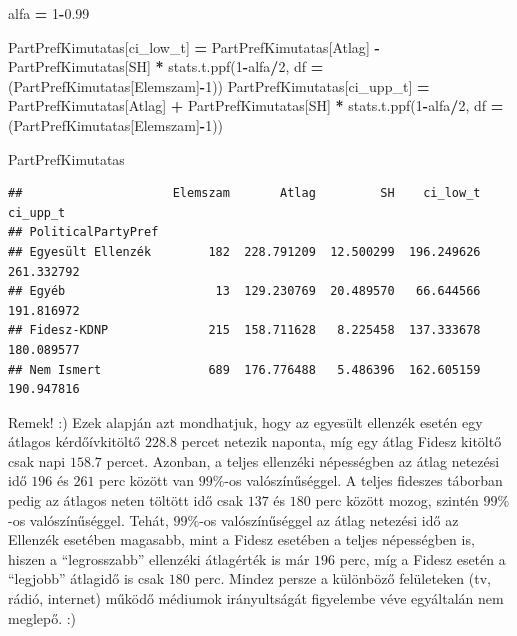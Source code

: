 \documentclass[
]{book}
\newenvironment{Shaded}{\begin{snugshade}}{\end{snugshade}}
\newcommand{\DecValTok}[1]{\textcolor[rgb]{0.00,0.00,0.81}{#1}}
\newcommand{\FloatTok}[1]{\textcolor[rgb]{0.00,0.00,0.81}{#1}}
\newcommand{\NormalTok}[1]{#1}
\newcommand{\OperatorTok}[1]{\textcolor[rgb]{0.81,0.36,0.00}{\textbf{#1}}}
\newcommand{\StringTok}[1]{\textcolor[rgb]{0.31,0.60,0.02}{#1}}
\begin{document}
\begin{Shaded}
\begin{Highlighting}[]
\NormalTok{alfa }\OperatorTok{=} \DecValTok{1}\OperatorTok{{-}}\FloatTok{0.99}

\NormalTok{PartPrefKimutatas[}\StringTok{\textquotesingle{}ci\_low\_t\textquotesingle{}}\NormalTok{] }\OperatorTok{=}\NormalTok{ PartPrefKimutatas[}\StringTok{\textquotesingle{}Atlag\textquotesingle{}}\NormalTok{] }\OperatorTok{{-}}\NormalTok{ PartPrefKimutatas[}\StringTok{\textquotesingle{}SH\textquotesingle{}}\NormalTok{] }\OperatorTok{*}\NormalTok{ stats.t.ppf(}\DecValTok{1}\OperatorTok{{-}}\NormalTok{alfa}\OperatorTok{/}\DecValTok{2}\NormalTok{, df }\OperatorTok{=}\NormalTok{ (PartPrefKimutatas[}\StringTok{\textquotesingle{}Elemszam\textquotesingle{}}\NormalTok{]}\OperatorTok{{-}}\DecValTok{1}\NormalTok{))}
\NormalTok{PartPrefKimutatas[}\StringTok{\textquotesingle{}ci\_upp\_t\textquotesingle{}}\NormalTok{] }\OperatorTok{=}\NormalTok{ PartPrefKimutatas[}\StringTok{\textquotesingle{}Atlag\textquotesingle{}}\NormalTok{] }\OperatorTok{+}\NormalTok{ PartPrefKimutatas[}\StringTok{\textquotesingle{}SH\textquotesingle{}}\NormalTok{] }\OperatorTok{*}\NormalTok{ stats.t.ppf(}\DecValTok{1}\OperatorTok{{-}}\NormalTok{alfa}\OperatorTok{/}\DecValTok{2}\NormalTok{, df }\OperatorTok{=}\NormalTok{ (PartPrefKimutatas[}\StringTok{\textquotesingle{}Elemszam\textquotesingle{}}\NormalTok{]}\OperatorTok{{-}}\DecValTok{1}\NormalTok{))}

\NormalTok{PartPrefKimutatas}
\end{Highlighting}
\end{Shaded}

\begin{verbatim}
##                     Elemszam       Atlag         SH    ci_low_t    ci_upp_t
## PoliticalPartyPref                                                         
## Egyesült Ellenzék        182  228.791209  12.500299  196.249626  261.332792
## Egyéb                     13  129.230769  20.489570   66.644566  191.816972
## Fidesz-KDNP              215  158.711628   8.225458  137.333678  180.089577
## Nem Ismert               689  176.776488   5.486396  162.605159  190.947816
\end{verbatim}

Remek! :) Ezek alapján azt mondhatjuk, hogy az egyesült ellenzék esetén egy átlagos kérdőívkitöltő \(228.8\) percet netezik naponta, míg egy átlag Fidesz kitöltő csak napi \(158.7\) percet.
Azonban, a teljes ellenzéki népességben az átlag netezési idő \(196\) és \(261\) perc között van \(99\%\)-os valószínűséggel. A teljes fideszes táborban pedig az átlagos neten töltött idő csak \(137\) és \(180\) perc között mozog, szintén \(99\%\)-os valószínűséggel.
Tehát, \(99\%\)-os valószínűséggel az átlag netezési idő az Ellenzék esetében magasabb, mint a Fidesz esetében a teljes népességben is, hiszen a ``legrosszabb'' ellenzéki átlagérték is már \(196\) perc, míg a Fidesz esetén a ``legjobb'' átlagidő is csak \(180\) perc.
Mindez persze a különböző felületeken (tv, rádió, internet) működő médiumok irányultságát figyelembe véve egyáltalán nem meglepő. :)
\end{document}
